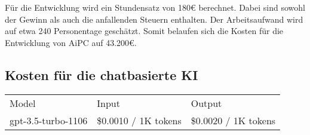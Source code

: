 Für die Entwicklung wird ein Stundensatz von 180€ berechnet. %
Dabei sind sowohl der Gewinn als auch die anfallenden Steuern enthalten.
Der Arbeitsaufwand wird auf etwa 240 Personentage geschätzt.
Somit belaufen sich die Kosten für die Entwicklung von \ac{AiPC} auf 43.200€.

\subsection{Kosten für die chatbasierte KI}\label{subsec:kosten-fuer-die-chatbasierte-ki}


\begin{table}[H]
    \begin{tabular}{lll}
        Model              & Input                & Output               \\
        gpt-3.5-turbo-1106 & \$0.0010 / 1K tokens & \$0.0020 / 1K tokens
    \end{tabular}
\end{table}
